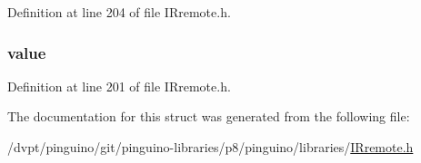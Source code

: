 Definition at line 204 of file I\-Rremote.\-h.

\hypertarget{structdecode__results_ad21d3c023f49c2da4c77f84340fd6b26}{
\subsubsection[{value}]{ value}}\label{structdecode__results_ad21d3c023f49c2da4c77f84340fd6b26}


Definition at line 201 of file I\-Rremote.\-h.



The documentation for this struct was generated from the following file\-:\begin{DoxyCompactItemize}
\item 
/dvpt/pinguino/git/pinguino-\/libraries/p8/pinguino/libraries/\hyperlink{_i_rremote_8h}{I\-Rremote.\-h}\end{DoxyCompactItemize}

